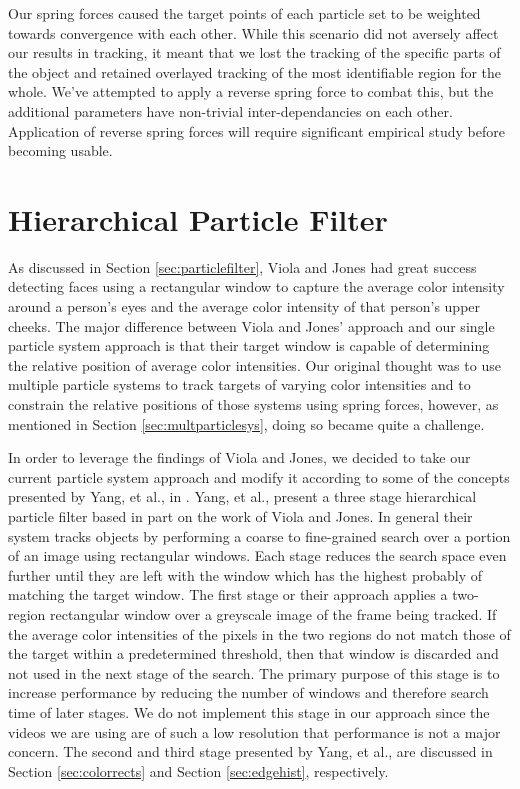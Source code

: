 \documentclass[11pt]{article}
\begin{document}
Our spring forces caused the target points of each particle set to be weighted towards convergence with each other.  While this scenario did not aversely affect our results in tracking, it meant that we lost the tracking of the specific parts of the object and retained overlayed tracking of the most identifiable region for the whole.  We've attempted to apply a reverse spring force to combat this, but the additional parameters have non-trivial inter-dependancies on each other. Application of reverse spring forces will require significant empirical study before becoming usable.  





\section{Hierarchical Particle Filter}
\label{sec:hybridfilter}

As discussed in Section \ref{sec:particlefilter}, Viola and Jones had great success detecting faces using a rectangular window to capture the average color intensity around a person's eyes and the average color intensity of that person's upper cheeks. The major difference between Viola and Jones' approach and our single particle system approach is that their target window is capable of determining the relative position of average color intensities. Our original thought was to use multiple particle systems to track targets of varying color intensities and to constrain the relative positions of those systems using spring forces, however, as mentioned in Section \ref{sec:multparticlesys}, doing so became quite a challenge. 

In order to leverage the findings of Viola and Jones, we decided to take our current particle system approach and modify it according to some of the concepts presented by Yang, et al., in \cite{hybrid}. Yang, et al., present a three stage hierarchical particle filter based in part on the work of Viola and Jones. In general their system tracks objects by performing a coarse to fine-grained search over a portion of an image using rectangular windows. Each stage reduces the search space even further until they are left with the window which has the highest probably of matching the target window. The first stage or their approach applies a two-region rectangular window over a greyscale image of the frame being tracked. If the average color intensities of the pixels in the two regions do not match those of the target within a predetermined threshold, then that window is discarded and not used in the next stage of the search. The primary purpose of this stage is to increase performance by reducing the number of windows and therefore search time of later stages. We do not implement this stage in our approach since the videos we are using are of such a low resolution that performance is not a major concern. The second and third stage presented by Yang, et al., are discussed in Section \ref{sec:colorrects} and Section \ref{sec:edgehist}, respectively.
\end{document}
